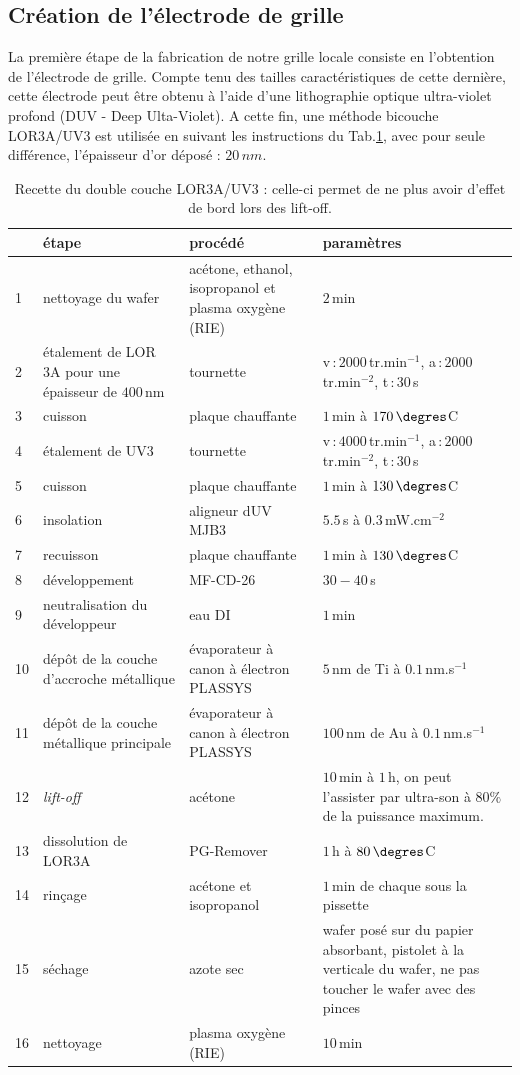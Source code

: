 \subsection{Création de l'électrode de grille}

La première étape de la fabrication de notre grille locale consiste en l'obtention de l'électrode de grille. Compte tenu des tailles caractéristiques de cette dernière, cette électrode peut \^etre obtenu à l'aide d'une lithographie optique ultra-violet profond (DUV - Deep Ulta-Violet). A cette fin, une méthode bicouche LOR3A/UV3 est utilisée en suivant les instructions du Tab.\ref{tab_recette}, avec pour seule différence, l'épaisseur d'or déposé : $20\,nm$.

\begin{table}
\begin{center}
\begin{tabular}{|p{0.5cm}|p{4cm}|p{4cm}|p{3cm}|}
  \hline
\,& \textbf{étape} & \textbf{procédé} & \textbf{paramètres} \tabularnewline
\hline
1 &  nettoyage du wafer & acétone, ethanol, isopropanol et plasma oxygène (RIE)& $2\,$min \tabularnewline
\hline
 2 & étalement de LOR 3A pour une épaisseur de $400\,$nm& tournette & v\,:\,$2000\,$tr.min$^{-1}$, a\,:\,$2000\,$tr.min$^{-2}$, t\,:\,$30\,$s \tabularnewline
\hline
 3 & cuisson & plaque chauffante & $1\,$min à $170\,\degres$C \tabularnewline
\hline
4 & étalement de UV3 & tournette & v\,:\,$4000\,$tr.min$^{-1}$, a\,:\,$2000\,$tr.min$^{-2}$, t\,:\,$30\,$s \tabularnewline
\hline
5 & cuisson & plaque chauffante & $1\,$min à $130\,\degres$C \tabularnewline
\hline
6 & insolation & aligneur dUV MJB3 & $5.5\,$s à $0.3\,$mW.cm$^{-2}$\tabularnewline
\hline
7 & recuisson & plaque chauffante & $1\,$min à $130\,\degres$C \tabularnewline
\hline
8 & développement & MF-CD-26 & $30-40\,$s\tabularnewline
\hline
9 & neutralisation du développeur & eau DI & $1\,$min\tabularnewline
\hline
10 & dépôt de la couche d'accroche métallique & évaporateur à canon à électron PLASSYS & $5\,$nm de Ti à $0.1\,$nm.s$^{-1}$ \tabularnewline
\hline
11 & dépôt de la couche métallique principale & évaporateur à canon à électron PLASSYS & $100\,$nm de Au à $0.1\,$nm.s$^{-1}$ \tabularnewline
\hline
12 & \textit{lift-off} & acétone & $10\,$min à $1\,$h, on peut l'assister par ultra-son à $80\%$ de la puissance maximum. \tabularnewline
\hline
 13 & dissolution de LOR3A & PG-Remover & $1\,$h à $80\,\degres$C \tabularnewline
\hline
14 & rinçage & acétone et isopropanol & $1\,$min de chaque sous la pissette\tabularnewline
\hline
15 & séchage & azote sec & wafer posé sur du papier absorbant, pistolet à la verticale du wafer, ne pas toucher le wafer avec des pinces\tabularnewline
\hline
16 & nettoyage & plasma oxygène (RIE)& $10\,$min\tabularnewline
\hline
\end{tabular}
\caption{Recette du double couche LOR3A/UV3 : celle-ci permet de ne plus avoir d'effet de bord lors des lift-off.}
\label{tab_recette}
\end{center}
\end{table}


